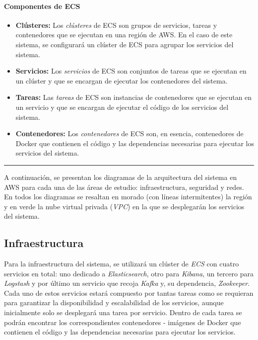 \newpage{}
\paragraph{Componentes de ECS}
\begin{itemize}
	\item \textbf{Clústeres:} Los \textit{clústeres} de ECS son grupos de
		servicios, tareas y contenedores que se ejecutan en una región de AWS.
		En el caso de este sistema, se configurará un clúster de ECS para
		agrupar los servicios del sistema.
	\item \textbf{Servicios:} Los \textit{servicios} de ECS son conjuntos de
		tareas que se ejecutan en un clúster y que se encargan de ejecutar los
		contenedores del sistema.
	\item \textbf{Tareas:} Las \textit{tareas} de ECS son instancias de
		contenedores que se ejecutan en un servicio y que se encargan de
		ejecutar el código de los servicios del sistema.
	\item \textbf{Contenedores:} Los \textit{contenedores} de ECS son, en
		esencia, contenedores de Docker que contienen el código y las
		dependencias necesarias para ejecutar los servicios del sistema.
\end{itemize}

\noindent\rule{14cm}{0.4pt}

A continuación, se presentan los diagramas de la arquitectura del sistema en AWS
para cada una de las áreas de estudio: infraestructura, seguridad y redes. En
todos los diagramas se resaltan en morado (con líneas intermitentes) la región y
en verde la nube virtual privada (\textit{VPC}) en la que se desplegarán los
servicios del sistema.


\newpage{}
\subsection{Infraestructura}\label{subsec:infra}
Para la infraestructura del sistema, se utilizará un clúster de \textit{ECS} con
cuatro servicios en total: uno dedicado a \textit{Elasticsearch}, otro para
\textit{Kibana}, un tercero para \textit{Logstash} y por último un servicio que
recoja \textit{Kafka} y, su dependencia, \textit{Zookeeper}. Cada uno de estos
servicios estará compuesto por tantas tareas como se requieran para garantizar
la disponibilidad y escalabilidad de los servicios, aunque inicialmente solo se
desplegará una tarea por servicio. Dentro de cada tarea se podrán encontrar los
correspondientes contenedores - imágenes de Docker que contienen el código y las
dependencias necesarias para ejecutar los servicios.

